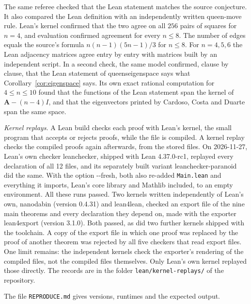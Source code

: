 \documentclass[11pt]{amsart}
\theoremstyle{plain}
\theoremstyle{definition}
\theoremstyle{remark}
\numberwithin{equation}{section}
\newcommand{\Adj}{\mathbf{A}}          %
\newcommand{\leanus}{\textunderscore\allowbreak}
\newcommand{\lean}[1]{{\ttfamily\let\_\leanus #1}}  %
\begin{document}
The same referee checked that the Lean statement matches the source conjecture. It also
compared the Lean definition with an independently written queen-move rule. Lean's
kernel confirmed that the two agree on all \(256\) pairs of squares for \(n=4\), and
evaluation confirmed agreement for every \(n\le8\). The number of edges equals the
source's formula \(n(n-1)(5n-1)/3\) for \(n\le8\). For \(n=4,5,6\) the Lean adjacency
matrices agree entry by entry with matrices built by an independent script. In a second
check, the same model confirmed, clause by clause, that the Lean statement of
\lean{queens\_eigenspace} says what Corollary~\ref{cor:eigenspace} says. Its own exact
rational computation for \(4\le n\le10\) found that the functions of the Lean statement
span the kernel of \(\Adj-(n-4)I\), and that the eigenvectors printed by Cardoso, Costa
and Duarte span the same space.

\emph{Kernel replays.} A Lean build checks each proof with Lean's kernel, the small
program that accepts or rejects proofs, while the file is compiled. A kernel replay checks
the compiled proofs again afterwards, from the stored files. On 2026-11-27, Lean's own
checker \lean{leanchecker}, shipped with Lean 4.37.0-rc1, replayed every declaration of
all 12 files, and its separately built variant \lean{leanchecker-paranoid} did the same.
With the option \lean{-{}-fresh}, both also re-added \nolinkurl{Main.lean} and everything
it imports, Lean's core library and Mathlib included, to an empty environment. All these
runs passed. Two kernels written independently of Lean's own, \lean{nanoda\_bin}
(version 0.4.31) and \lean{lean4lean}, checked an export file of the nine main theorems
and every declaration they depend on, made with the exporter \lean{lean4export}
(version 3.1.0). Both passed, as did two further kernels shipped with the toolchain. A
copy of the export file in which one proof was replaced by the proof of another theorem
was rejected by all five checkers that read export files. One limit remains: the independent kernels
check the exporter's rendering of the compiled files, not the compiled files themselves.
Only Lean's own kernel replayed those directly. The records are in the folder
\nolinkurl{lean/kernel-replays/} of the repository.

The file \nolinkurl{REPRODUCE.md} gives versions, runtimes and the expected output.
\end{document}

